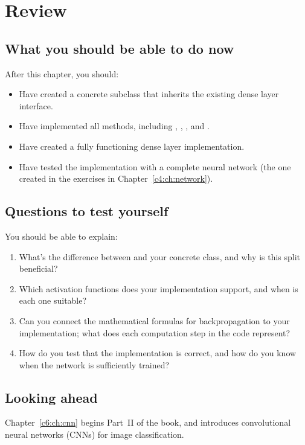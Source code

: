 
\section{Review}
\label{c5:sec:review}

\subsection*{What you should be able to do now}
After this chapter, you should:
\begin{itemize}
  \item Have created a concrete subclass that inherits the existing dense layer interface.
  \item Have implemented all methods, including , ,
    , and .
  \item Have created a fully functioning dense layer implementation.
  \item Have tested the implementation with a complete neural network (the one created in the
    exercises in Chapter~\ref{c4:ch:network}).
\end{itemize}

\subsection*{Questions to test yourself}
You should be able to explain:
\begin{enumerate}
  \item What's the difference between  and your concrete class,
    and why is this split beneficial?
  \item Which activation functions does your implementation support, and when is each one
    suitable?
  \item Can you connect the mathematical formulas for backpropagation to your implementation; what
    does each computation step in the code represent?
  \item How do you test that the implementation is correct, and how do you know when the network
    is sufficiently trained?
\end{enumerate}

\subsection*{Looking ahead}
Chapter~\ref{c6:ch:cnn} begins Part~II of the book, and introduces convolutional neural networks
(CNNs) for image classification.
